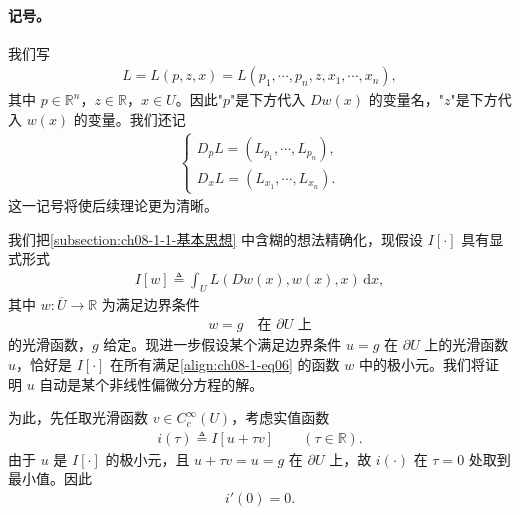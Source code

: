 \documentclass[../../main.tex]{subfiles}
\begin{document}
\paragraph{记号。}我们写
\begin{align*}
L=L(p,z,x)=L(p_1,\cdots,p_n,z,x_1,\cdots,x_n),
\end{align*}
其中 $p\in\mathbb{R}^n$，$z\in\mathbb{R}$，$x\in U$。因此"$p$"是下方代入 $Dw(x)$ 的变量名，"$z$"是下方代入 $w(x)$ 的变量。我们还记
\begin{align}
\begin{cases}
D_pL=(L_{p_1},\cdots,L_{p_n}),\\
D_xL=(L_{x_1},\cdots,L_{x_n}).
\end{cases}\label{align:ch08-1-eq04}
\end{align}
这一记号将使后续理论更为清晰。

我们把\cref{subsection:ch08-1-1-基本思想} 中含糊的想法精确化，现假设 $I[\cdot]$ 具有显式形式
\begin{align}
I[w]\triangleq\int_U L(Dw(x),w(x),x)\,\mathrm{d}x,\label{align:ch08-1-eq05}
\end{align}
其中 $w:\overline{U}\to\mathbb{R}$ 为满足边界条件
\begin{align}
w=g\quad\text{在 }\partial U\text{ 上}\label{align:ch08-1-eq06}
\end{align}
的光滑函数，$g$ 给定。现进一步假设某个满足边界条件 $u=g$ 在 $\partial U$ 上的光滑函数 $u$，恰好是 $I[\cdot]$ 在所有满足\eqref{align:ch08-1-eq06} 的函数 $w$ 中的极小元。我们将证明 $u$ 自动是某个非线性偏微分方程的解。

为此，先任取光滑函数 $v\in C_c^\infty(U)$，考虑实值函数
\begin{align}
i(\tau)\triangleq I[u+\tau v]\qquad (\tau\in\mathbb{R}).\label{align:ch08-1-eq07}
\end{align}
由于 $u$ 是 $I[\cdot]$ 的极小元，且 $u+\tau v=u=g$ 在 $\partial U$ 上，故 $i(\cdot)$ 在 $\tau=0$ 处取到最小值。因此
\begin{align}
i'(0)=0.\label{align:ch08-1-eq08}
\end{align}
\end{document}
